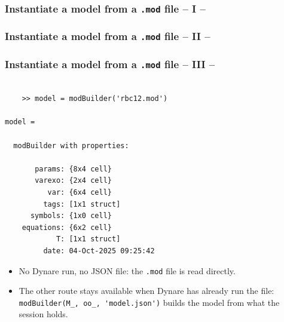 \documentclass[10pt,slidestop]{beamer}
\theoremstyle{plain}
\begin{document}
\begin{frame}[fragile]
  \frametitle{Instantiate a model from a \texttt{.mod} file -- I --}

  

\end{frame}

\begin{frame}[fragile]
  \frametitle{Instantiate a model from a \texttt{.mod} file -- II --}

  

\end{frame}


\begin{frame}[fragile]
  \frametitle{Instantiate a model from a \texttt{.mod} file -- III --}

  \begin{lstlisting}[style=MatlabConsole]

    >> model = modBuilder('rbc12.mod')

model =

  modBuilder with properties:

       params: {8x4 cell}
       varexo: {2x4 cell}
          var: {6x4 cell}
         tags: [1x1 struct]
      symbols: {1x0 cell}
    equations: {6x2 cell}
            T: [1x1 struct]
         date: 04-Oct-2025 09:25:42
   \end{lstlisting}

  \begin{itemize}\small
  \item No Dynare run, no JSON file: the \texttt{.mod} file is read directly.
  \item The other route stays available when Dynare has already run the file:
    \verb+modBuilder(M_, oo_, 'model.json')+ builds the model from what the session holds.
  \end{itemize}

\end{frame}
\end{document}
